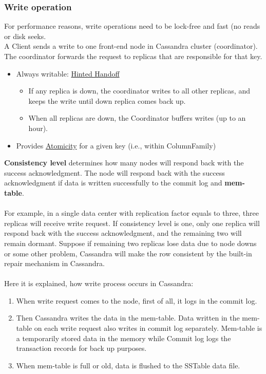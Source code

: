 \documentclass[10pt,a4paper]{article}
\newcommand{\nline}{\\~\\}
\begin{document}
\subsubsection{Write operation}
For performance reasons, write operations need to be lock-free and fast (no reads or disk seeks.\\ 
A Client sends a write to one front-end node in Cassandra cluster (coordinator). The coordinator forwards the request to replicas that are responsible for that key. 
\begin{itemize}
	\item Always writable: \uline{Hinted Handoff} 
	\begin{itemize}
		\item If any replica is down, the coordinator writes to all other replicas, and keeps the write until down replica comes back up.
		\item When all replicas are down, the Coordinator buffers writes (up to an hour).
	\end{itemize}	
	\item Provides \uline{Atomicity} for a given key (i.e., within ColumnFamily)
\end{itemize}
\textbf{Consistency level} determines how many nodes will respond back with the success acknowledgment. The node will respond back with the success acknowledgment if data is written successfully to the commit log and \textbf{mem-table}. \nline
For example, in a single data center with replication factor equals to three, three replicas will receive write request. If consistency level is one, only one replica will respond back with the success acknowledgment, and the remaining two will remain dormant. Suppose if remaining two replicas lose data due to node downs or some other problem, Cassandra will make the row consistent by the built-in repair mechanism in Cassandra. \nline

Here it is explained, how write process occurs in Cassandra:
\begin{enumerate}
	\item When write request comes to the node, first of all, it logs in the commit log.
	\item Then Cassandra writes the data in the mem-table. Data written in the mem-table on each write request also writes in commit log separately. Mem-table is a temporarily stored data in the memory while Commit log logs the transaction records for back up purposes.
	\item When mem-table is full or old, data is flushed to the SSTable data file.
\end{enumerate}
\end{document}
